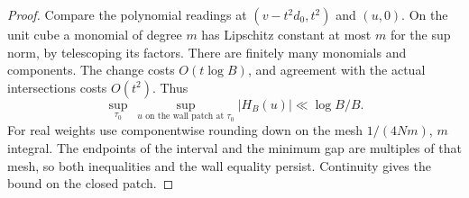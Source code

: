 \begin{proof}
Compare the polynomial readings at \((v-t^2d_0,t^2)\) and
\((u,0)\). On the unit cube a monomial of degree \(m\) has
Lipschitz constant at most \(m\) for the sup norm, by telescoping
its factors. There are finitely many monomials and components.
The change costs \(O(t\log B)\), and agreement with the actual
intersections costs \(O(t^2)\). Thus
\begin{equation}\label{eq:flag-wall-small}
   \sup_{\tau_0}\ \sup_{u\text{ on the wall patch at }\tau_0}
                 |H_B(u)|\ll \log B/B .
\end{equation}
For real weights use componentwise rounding down on the mesh
\(1/(4Nm)\), \(m\) integral. The endpoints of the interval and
the minimum gap are multiples of that mesh, so both inequalities
and the wall equality persist. Continuity gives the bound on
the closed patch.

\end{proof}

